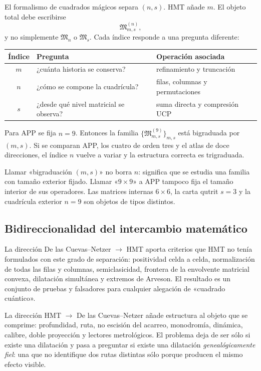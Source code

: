 El formalismo de cuadrados mágicos separa $(n,s)$. HMT añade $m$. El
objeto total debe escribirse
\[
 \mathfrak M^{(n)}_{m,s},
 \tag{GMC-1.5}
\]
y no simplemente \(\mathfrak M_n\) o \(\mathfrak M_s\). Cada índice responde
a una pregunta diferente:

\begin{center}
\begin{tabularx}{.92\textwidth}{@{}c L{.25\textwidth}Y@{}}
\toprule
Índice & Pregunta & Operación asociada\\
\midrule
$m$ & ¿cuánta historia se conserva? & refinamiento y truncación\\
$n$ & ¿cómo se compone la cuadrícula? & filas, columnas y permutaciones\\
$s$ & ¿desde qué nivel matricial se observa? & suma directa y compresión UCP\\
\bottomrule
\end{tabularx}
\end{center}

Para APP se fija $n=9$. Entonces la familia
$\{\mathfrak M^{(9)}_{m,s}\}_{m,s}$ está bigraduada por $(m,s)$. Si se
comparan APP, los cuatro \QLS de orden tres y el atlas de doce direcciones, el
índice $n$ vuelve a variar y la estructura correcta es trigraduada.

\begin{controlbox}
Llamar «bigraduación $(m,s)$» no borra $n$: significa que se estudia una
familia con tamaño exterior fijado. Llamar «$9\times9$» a APP tampoco fija
el tamaño interior de sus operadores. Las matrices internas $6\times6$, la
carta qutrit $s=3$ y la cuadrícula exterior $n=9$ son objetos de tipos
distintos.
\end{controlbox}

\subsection{Bidireccionalidad del intercambio matemático}

La dirección De las Cuevas--Netzer $\longrightarrow$ HMT aporta criterios que HMT no
tenía formulados con este grado de separación: positividad celda a celda,
normalización de todas las filas y columnas, semiclasicidad, frontera de la
envolvente matricial convexa, dilatación simultánea y extremos de Arveson. El
resultado es un conjunto de pruebas y falsadores para cualquier alegación de
«cuadrado cuántico».

La dirección HMT $\longrightarrow$ De las Cuevas--Netzer añade estructura al objeto que
se comprime: profundidad, ruta, no escisión del acarreo, monodromía, dinámica,
calibre, doble proyección y lectores metrológicos. El problema deja de ser
sólo si existe una dilatación y pasa a preguntar si existe una dilatación
\emph{genealógicamente fiel}: una que no identifique dos rutas distintas sólo
porque producen el mismo efecto visible.

